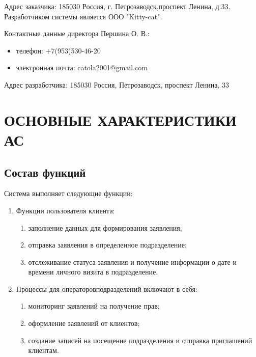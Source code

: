 \documentclass[russian, utf8, 12pt,pointsubsection,floatsubsection]{eskdtext}
\begin{document}
Адрес заказчика: 185030 Россия, г. Петрозаводск,проспект Ленина, д.33.\\

Разработчиком системы является ООО "Kitty-cat".

Контактные данные директора Першина О. В.: 
\begin{itemize}
    \item телефон: +7(953)530-46-20 
    \item электронная почта: catola2001@gmail.com
\end{itemize}

Адрес разработчика: 185030 Россия, Петрозаводск, проспект Ленина, 33\\


\section{ОСНОВНЫЕ ХАРАКТЕРИСТИКИ АС}
\subsection{Состав функций}
Система выполняет следующие функции:
\begin{enumerate}
    \item Функции пользователя клиента:
    \begin{enumerate}
        \item заполнение данных для формирования заявления;
        \item отправка заявления в определенное подразделение;
        \item отслеживание статуса заявления и получение информации о дате и времени личного визита в подразделение.
    \end{enumerate}
    
    \item Процессы для операторовподразделений включают в себя:
    \begin{enumerate}
        \item мониторинг заявлений на получение прав;
        \item оформление заявлений от клиентов;
        \item создание записей на посещение подразделения и отправка приглашений клиентам.
    \end{enumerate}
\end{enumerate}
\end{document}
